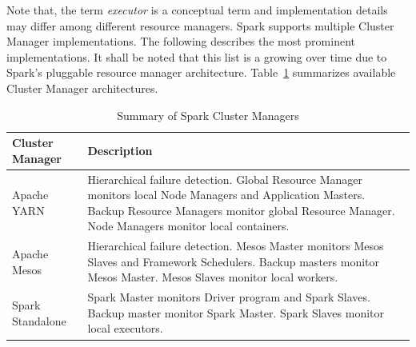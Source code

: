 Note that, the term \emph{executor} is a conceptual term and implementation details may differ among different resource managers. Spark supports multiple Cluster Manager implementations. The following describes the most prominent implementations. It shall be noted that this list is a growing over time due to Spark's pluggable resource manager architecture. Table~\ref{tab:spark-cluster} summarizes available Cluster Manager architectures.
\begin{table}[h]
    \begin{tabularx}{\textwidth}{lX}
        \toprule
        \textbf{Cluster Manager} & \textbf{Description}\\
        \midrule
        Apache YARN & Hierarchical failure detection. Global Resource Manager monitors local Node Managers and Application Masters. Backup Resource Managers monitor global Resource Manager. Node Managers monitor local containers.\\
        Apache Mesos & Hierarchical failure detection. Mesos Master monitors Mesos Slaves and Framework Schedulers. Backup masters monitor Mesos Master. Mesos Slaves monitor local workers.\\
        Spark Standalone & Spark Master monitors Driver program and Spark Slaves. Backup master monitor Spark Master. Spark Slaves monitor local executors.\\
        \bottomrule
    \end{tabularx}
    \centering
    \caption{Summary of Spark Cluster Managers}
    \label{tab:spark-cluster}
\end{table}
